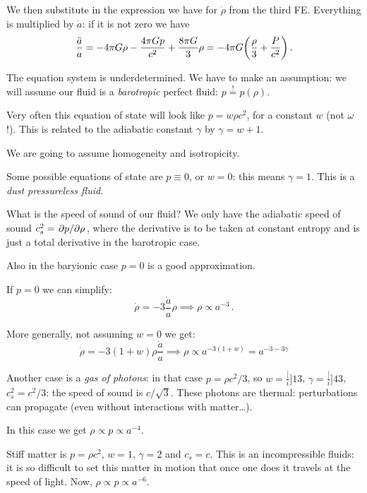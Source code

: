 \documentclass[main.tex]{subfiles}
\begin{document}
We then substitute in the expression we have for \(\dot{\rho} \) from the third FE.
Everything is multiplied by \(\dot{a} \): if it is not zero we have
\begin{equation}
  \frac{\ddot{a}}{a} = - 4 \pi G \rho - \frac{4 \pi G p}{c^2} + \frac{8 \pi G}{3} \rho= 
  - 4 \pi G \qty(\frac{\rho}{3} + \frac{P}{c^2})\,.
\end{equation}

The equation system is underdetermined. We have to make an assumption: we will assume our fluid is a \emph{barotropic} perfect fluid: \(p \overset{!}{=} p(\rho)\).

Very often this equation of state will look like \(p = w \rho c^2\), for a constant \(w\) (not \(\omega\)!). This is related to the adiabatic constant \(\gamma\) by \(\gamma = w+1\).

We are going to assume homogeneity and isotropicity.

Some possible equations of state are \(p \equiv 0\), or \(w =0\): this means \(\gamma =1 \). This is a \emph{dust pressureless fluid}.

What is the speed of sound of our fluid? We only have the adiabatic speed of sound \(c_s^2 = \pdv*{p}{\rho}\), where the derivative is to be taken at constant entropy and is just a total derivative in the barotropic case.

Also in the baryionic case \(p=0\) is a good approximation.

If \(p=0\) we can simplify:
\begin{equation}
  \dot{\rho} = -3 \frac{\dot{a} }{a} \rho \implies 
  \rho \propto a^{-3}\,.
\end{equation}

More generally, not assuming \(w=0\) we get:
\begin{equation}
  \dot{\rho} = -3 (1+w) \rho \frac{\dot{a} }{a} \implies \rho \propto a^{-3 (1+w)} = a^{-3 -3\gamma}
\end{equation}

Another case is a \emph{gas of photons}: in that case \(p = \rho c^2 / 3\), so \(w=\frac[i]{1}{3} \), \(\gamma = \frac[i]{4}{3} \), \(c_{s}^2 = c^2 / 3 \): the speed of sound is \(c / \sqrt{3} \). These photons are thermal: perturbations can propagate (even without interactions with matter\dots). 

In this case we get \(\rho \propto p \propto a^{-4}\).

Stiff matter is \(p = \rho c^2\), \(w=1\), \(\gamma=2\) and \(c_s = c\). This is an incompressible fluids: it is so difficult to set this matter in motion that once one does it travels at the speed of light. Now, \(\rho \propto p \propto a^{-6}\).
\end{document}
